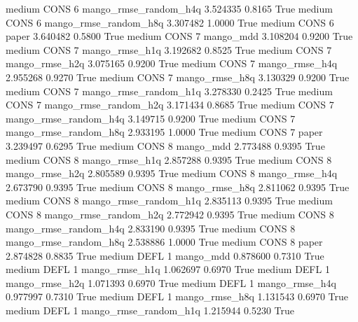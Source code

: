     medium     CONS                 6 mango_rmse_random_h4q   3.524335      0.8165    True
    medium     CONS                 6 mango_rmse_random_h8q   3.307482      1.0000    True
    medium     CONS                 6                 paper   3.640482      0.5800    True
    medium     CONS                 7             mango_mdd   3.108204      0.9200    True
    medium     CONS                 7        mango_rmse_h1q   3.192682      0.8525    True
    medium     CONS                 7        mango_rmse_h2q   3.075165      0.9200    True
    medium     CONS                 7        mango_rmse_h4q   2.955268      0.9270    True
    medium     CONS                 7        mango_rmse_h8q   3.130329      0.9200    True
    medium     CONS                 7 mango_rmse_random_h1q   3.278330      0.2425    True
    medium     CONS                 7 mango_rmse_random_h2q   3.171434      0.8685    True
    medium     CONS                 7 mango_rmse_random_h4q   3.149715      0.9200    True
    medium     CONS                 7 mango_rmse_random_h8q   2.933195      1.0000    True
    medium     CONS                 7                 paper   3.239497      0.6295    True
    medium     CONS                 8             mango_mdd   2.773488      0.9395    True
    medium     CONS                 8        mango_rmse_h1q   2.857288      0.9395    True
    medium     CONS                 8        mango_rmse_h2q   2.805589      0.9395    True
    medium     CONS                 8        mango_rmse_h4q   2.673790      0.9395    True
    medium     CONS                 8        mango_rmse_h8q   2.811062      0.9395    True
    medium     CONS                 8 mango_rmse_random_h1q   2.835113      0.9395    True
    medium     CONS                 8 mango_rmse_random_h2q   2.772942      0.9395    True
    medium     CONS                 8 mango_rmse_random_h4q   2.833190      0.9395    True
    medium     CONS                 8 mango_rmse_random_h8q   2.538886      1.0000    True
    medium     CONS                 8                 paper   2.874828      0.8835    True
    medium     DEFL                 1             mango_mdd   0.878600      0.7310    True
    medium     DEFL                 1        mango_rmse_h1q   1.062697      0.6970    True
    medium     DEFL                 1        mango_rmse_h2q   1.071393      0.6970    True
    medium     DEFL                 1        mango_rmse_h4q   0.977997      0.7310    True
    medium     DEFL                 1        mango_rmse_h8q   1.131543      0.6970    True
    medium     DEFL                 1 mango_rmse_random_h1q   1.215944      0.5230    True
